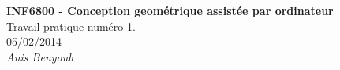 \begin{titlepage}
    \vspace*{3.5cm}
    \begin{center} 
        \LARGE{ \textbf{INF6800 - Conception geométrique assistée par ordinateur} }\\[1cm]
        \Large{Travail pratique numéro 1.}\\
        \normalsize{05/02/2014}\\[1cm]
        \normalsize{ \textit{Anis Benyoub} }
    	\begin{figure}[ht]
	\centering
	\end{figure}
    \end{center}
    
\end{titlepage}